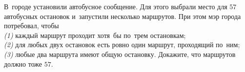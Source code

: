 \begin{problems}
\item
В~городе установили автобусное сообщение.
Для этого выбрали место для $57$ автобусных остановок и~запустили несколько
маршрутов.
При этом мэр города потребовал, чтобы
\\
\textit{(1)}
каждый маршрут проходит хотя~бы по~трем остановкам;
\\
\textit{(2)}
для любых двух остановок есть ровно один маршрут, проходящий по~ним;
\\
\textit{(3)}
любые два маршрута имеют общую остановку.
Докажите, что маршрутов должно тоже $57$.

\end{problems}

